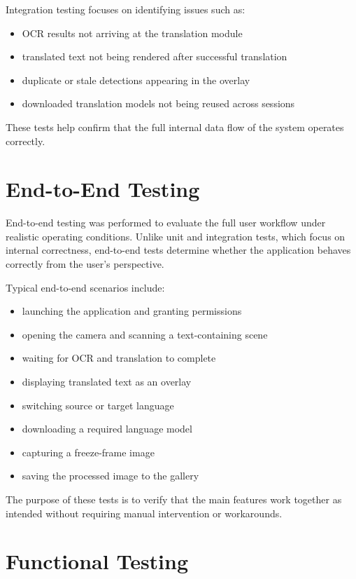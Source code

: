 Integration testing focuses on identifying issues such as:

\begin{itemize}
    \item OCR results not arriving at the translation module
    \item translated text not being rendered after successful translation
    \item duplicate or stale detections appearing in the overlay
    \item downloaded translation models not being reused across sessions
\end{itemize}

These tests help confirm that the full internal data flow of the system operates correctly.

\section{End-to-End Testing}

End-to-end testing was performed to evaluate the full user workflow under realistic operating conditions. Unlike unit and integration tests, which focus on internal correctness, end-to-end tests determine whether the application behaves correctly from the user's perspective.

Typical end-to-end scenarios include:

\begin{itemize}
    \item launching the application and granting permissions
    \item opening the camera and scanning a text-containing scene
    \item waiting for OCR and translation to complete
    \item displaying translated text as an overlay
    \item switching source or target language
    \item downloading a required language model
    \item capturing a freeze-frame image
    \item saving the processed image to the gallery
\end{itemize}

The purpose of these tests is to verify that the main features work together as intended without requiring manual intervention or workarounds.

\section{Functional Testing}

